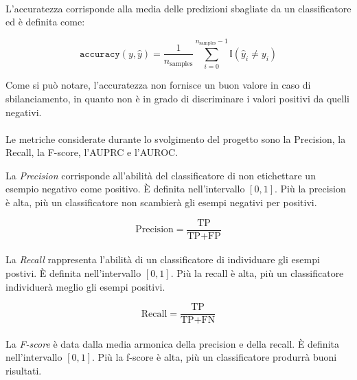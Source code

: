 \documentclass[12pt,a4paper,oneside,hidelinks]{report}
\begin{document}
\paragraph*{}
L'accuratezza corrisponde alla media delle predizioni sbagliate da un classificatore ed è definita come:

\begin{equation}
\texttt{accuracy}(y, \hat{y}) = \frac{1}{n_\text{samples}} \sum_{i=0}^{n_\text{samples}-1} \mathbb{I}(\hat{y}_i \neq y_i)
\end{equation}

Come si può notare, l'accuratezza non fornisce un buon valore in caso di sbilanciamento, in quanto non è in grado di discriminare i valori positivi da quelli negativi.

\paragraph*{}
Le metriche considerate durante lo svolgimento del progetto sono la Precision, la Recall, la F-score, l'AUPRC e l'AUROC.

La \textit{Precision} corrisponde all'abilità del classificatore di non etichettare un esempio negativo come positivo. È definita nell'intervallo $[0,1]$. Più la precision è alta, più un classificatore non scambierà gli esempi negativi per positivi.

\begin{equation}
\text{Precision} = \frac{\text{TP}}{\text{TP} + \text{FP}}
\end{equation}

\paragraph*{}
La \textit{Recall} rappresenta l'abilità di un classificatore di individuare gli esempi postivi. È definita nell'intervallo $[0,1]$. Più la recall è alta, più un classificatore individuerà meglio gli esempi positivi.

\begin{equation}
\text{Recall} = \frac{\text{TP}}{\text{TP} + \text{FN}}
\end{equation}

\paragraph*{}
La \textit{F-score} è data dalla media armonica della precision e della recall. È definita nell'intervallo $[0,1]$. Più la f-score è alta, più un classificatore produrrà buoni risultati.
\end{document}
